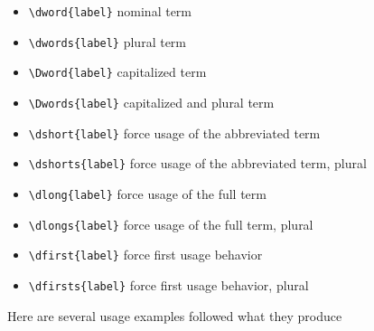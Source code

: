 \documentclass{article}
\begin{document}
\begin{itemize}
\item \verb|\dword{label}| nominal term
\item \verb|\dwords{label}| plural term
\item \verb|\Dword{label}| capitalized term
\item \verb|\Dwords{label}| capitalized and plural term
\item \verb|\dshort{label}| force usage of the abbreviated term
\item \verb|\dshorts{label}| force usage of the abbreviated term, plural
\item \verb|\dlong{label}| force usage of the full term
\item \verb|\dlongs{label}| force usage of the full term, plural
\item \verb|\dfirst{label}| force first usage behavior
\item \verb|\dfirsts{label}| force first usage behavior, plural
\end{itemize}


\noindent Here are several usage examples followed what they produce
\end{document}
